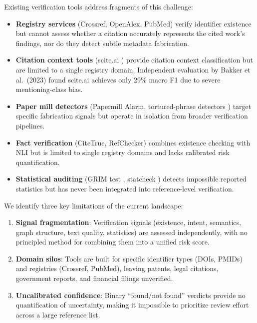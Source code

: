 \documentclass[sigconf,nonacm]{acmart}
\begin{document}
Existing verification tools address fragments of this challenge:

\begin{itemize}[leftmargin=*]
    \item \textbf{Registry services} (Crossref, OpenAlex, PubMed) verify identifier existence but cannot assess whether a citation accurately represents the cited work's findings, nor do they detect subtle metadata fabrication.
    \item \textbf{Citation context tools} (scite.ai \cite{scite2019}) provide citation context classification but are limited to a single registry domain. Independent evaluation by Bakker et al.\ (2023) found scite.ai achieves only 29\% macro F1 due to severe mentioning-class bias.
    \item \textbf{Paper mill detectors} (Papermill Alarm, tortured-phrase detectors \cite{cabanac2021}) target specific fabrication signals but operate in isolation from broader verification pipelines.
    \item \textbf{Fact verification} (CiteTrue, RefChecker) combines existence checking with NLI but is limited to single registry domains and lacks calibrated risk quantification.
    \item \textbf{Statistical auditing} (GRIM test \cite{brown2017grim}, statcheck \cite{nuijten2016}) detects impossible reported statistics but has never been integrated into reference-level verification.
\end{itemize}

We identify three key limitations of the current landscape:

\begin{enumerate}
    \item \textbf{Signal fragmentation}: Verification signals (existence, intent, semantics, graph structure, text quality, statistics) are assessed independently, with no principled method for combining them into a unified risk score.
    \item \textbf{Domain silos}: Tools are built for specific identifier types (DOIs, PMIDs) and registries (Crossref, PubMed), leaving patents, legal citations, government reports, and financial filings unverified.
    \item \textbf{Uncalibrated confidence}: Binary ``found/not found'' verdicts provide no quantification of uncertainty, making it impossible to prioritize review effort across a large reference list.
\end{enumerate}
\end{document}
